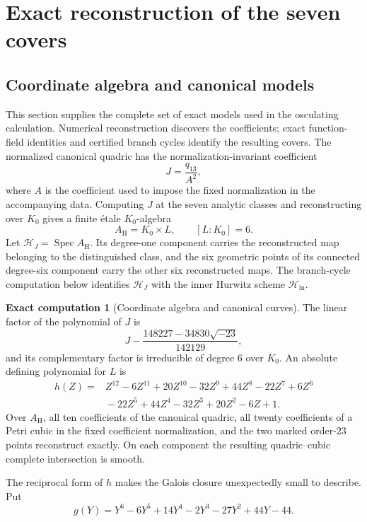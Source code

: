 \documentclass[11pt]{amsart}
\theoremstyle{definition}
\newtheorem{computation}[computation]{Exact computation}
\theoremstyle{remark}
\begin{document}
\section{Exact reconstruction of the seven covers}
\label{sec:hurwitz-scheme}

\subsection{Coordinate algebra and canonical models}

This section supplies the complete set of exact models used in the
osculating calculation.  Numerical reconstruction discovers the
coefficients; exact function-field identities and certified branch cycles
identify the resulting covers.  The normalized canonical
quadric has the normalization-invariant coefficient
\[
 J=\frac{q_{13}}{A^2},
\]
where $A$ is the coefficient used to impose the fixed normalization in the
accompanying data.  Computing $J$ at the seven analytic classes and
reconstructing over $K_0$ gives a finite étale $K_0$-algebra
\[
 A_{\mathrm H}=K_0\times L,
 \qquad [L:K_0]=6.
\]
Let $\mathcal H_J=\operatorname{Spec}A_{\mathrm H}$.  Its degree-one
component carries the reconstructed map belonging to the distinguished class,
and the six geometric points of its connected degree-six component carry the
other six
reconstructed maps.  The branch-cycle computation below identifies
$\mathcal H_J$ with the inner Hurwitz scheme $\mathcal H_{\mathrm{in}}$.

\begin{computation}[Coordinate algebra and canonical curves]
\label{comp:hurwitz-coordinate-algebra}
The linear factor of the polynomial of $J$ is
\[
 J-\frac{148227-34830\sqrt{-23}}{142129},
\]
and its complementary factor is irreducible of degree $6$ over $K_0$.
An absolute defining polynomial for $L$ is
\[
\begin{split}
 h(Z)={}&Z^{12}-6Z^{11}+20Z^{10}-32Z^9+44Z^8-22Z^7+6Z^6\\
       &{}-22Z^5+44Z^4-32Z^3+20Z^2-6Z+1.
\end{split}
\]
Over $A_{\mathrm H}$, all ten coefficients of the canonical quadric, all
twenty coefficients of a Petri cubic in the fixed coefficient
normalization, and the two marked
order-$23$ points reconstruct exactly.  On each component the resulting
quadric--cubic complete intersection is smooth.
\end{computation}

The reciprocal form of $h$ makes the Galois closure unexpectedly small to
describe.  Put
\[
 g(Y)=Y^6-6Y^5+14Y^4-2Y^3-27Y^2+44Y-44.
\]
\end{document}
